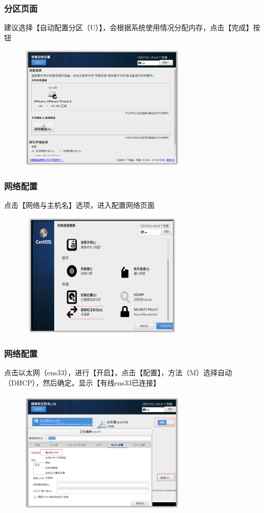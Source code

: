 \documentclass[notheorems,serif]{beamer}
\begin{document}
\begin{frame}
\frametitle{分区页面}
建议选择【自动配置分区（U）】，会根据系统使用情况分配内存，点击【完成】按钮
\begin{figure}
 \centering
 \includegraphics[width=8cm,height=6cm]{./figures/图片28.png}
\end{figure}
\end{frame}

\begin{frame}
\frametitle{网络配置}
点击【网络与主机名】选项，进入配置网络页面
\begin{figure}
 \centering
 \includegraphics[width=8cm,height=6cm]{./figures/图片29.png}
\end{figure}
\end{frame}

\begin{frame}
\frametitle{网络配置}
点击以太网（ens33），进行【开启】，点击【配置】，方法（M）选择自动（DHCP），然后确定。显示【有线ens33已连接】
\begin{figure}
 \centering
 \includegraphics[width=8cm,height=6cm]{./figures/图片30.png}
\end{figure}
\end{frame}
\end{document}
